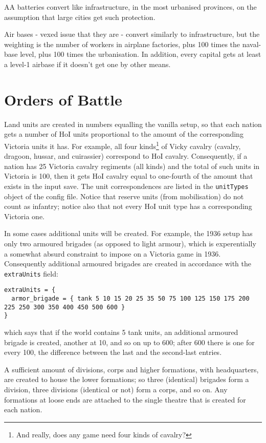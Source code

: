 \documentclass[12pt,ebook,oneside]{book}
\begin{document}
AA batteries convert like infrastructure, in the most urbanised
provinces, on the assumption that large cities get such protection. 

Air bases - vexed issue that they are - convert similarly to
infrastructure, but the weighting is the number of workers in airplane
factories, plus 100 times the naval-base level, plus 100 times the
urbanisation. In addition, every capital gets at least a level-1
airbase if it doesn't get one by other means. 

\section{Orders of Battle}

Land units are created in numbers equalling the vanilla setup, so that
each nation gets a number of HoI units proportional to the amount of the
corresponding Victoria units it has. For example, all four
kinds\footnote{And really, does any game need four kinds of cavalry?}
of Vicky cavalry (cavalry, dragoon, hussar, and cuirassier) correspond
to HoI cavalry. Consequently, if a nation has 25 Victoria cavalry
regiments (all kinds) and the total of such units in Victoria is 100,
then it gets HoI cavalry equal to one-fourth of the amount that exists
in the input save. The unit correspondences are listed in the
\texttt{unitTypes} object of the config file. Notice that reserve
units (from mobilisation) do not count as infantry; notice also that
not every HoI unit type has a corresponding Victoria one. 

In some cases additional units will be created. For example, the 1936
setup has only two armoured brigades (as opposed to light armour),
which is experentially a somewhat absurd constraint to impose on a
Victoria game in 1936. Consequently additional armoured brigades are
created in accordance with the \texttt{extraUnits} field:
\begin{verbatim}
extraUnits = {
  armor_brigade = { tank 5 10 15 20 25 35 50 75 100 125 150 175 200 225 250 300 350 400 450 500 600 }
}
\end{verbatim}
which says that if the world contains 5 tank units, an additional
armoured brigade is created, another at 10, and so on up to 600; after
600 there is one for every 100, the difference between the last and
the second-last entries. 

A sufficient amount of divisions, corps and higher formations, with headquarters, are created to
house the lower formations; so three (identical) brigades form a
division, three divisions (identical or not) form a corps, and so
on. Any formations at loose ends are attached to the single theatre
that is created for each nation. 
\end{document}
